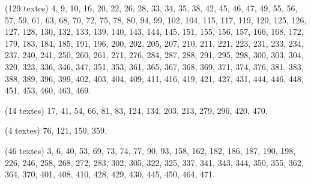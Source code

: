 \begin{description}[style=nextline,leftmargin=1.5em,font=\normalfont\scshape]
\item[En toutes lettres, sans correction] (129 textes) 4, 9, 10, 16, 20, 22, 26, 28, 33, 34, 35, 38, 42, 45, 46, 47, 49, 55, 56, 57, 59, 61, 63, 68, 70, 72, 75, 78, 80, 94, 99, 102, 104, 115, 117, 119, 120, 125, 126, 127, 128, 130, 132, 133, 139, 140, 143, 144, 145, 151, 155, 156, 157, 166, 168, 172, 179, 183, 184, 185, 191, 196, 200, 202, 205, 207, 210, 211, 221, 223, 231, 233, 234, 237, 240, 241, 250, 260, 261, 271, 276, 284, 287, 288, 291, 295, 298, 300, 303, 304, 320, 323, 336, 346, 347, 351, 353, 361, 365, 367, 368, 369, 371, 374, 376, 381, 383, 388, 389, 396, 399, 402, 403, 404, 409, 411, 416, 419, 421, 427, 431, 444, 446, 448, 451, 453, 460, 463, 469.
\item[Abrégée, sans restitution ni correction] (14 textes) 17, 41, 54, 66, 81, 83, 124, 134, 203, 213, 279, 296, 420, 470.
\item[Avec correction éditoriale, sans restitution] (4 textes) 76, 121, 150, 359.
\item[Seulement avec restitution] (46 textes) 3, 6, 40, 53, 69, 73, 74, 77, 90, 93, 158, 162, 182, 186, 187, 190, 198, 226, 246, 258, 268, 272, 283, 302, 305, 322, 325, 337, 341, 343, 344, 350, 355, 362, 364, 370, 401, 408, 410, 428, 429, 430, 445, 450, 464, 471.
\end{description}
